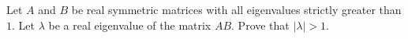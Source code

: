 Let \(A\) and \(B\) be real symmetric matrices with all eigenvalues strictly greater than \(1\). Let \(\lambda\) be a real eigenvalue of the matrix \(AB\). Prove that \(|\lambda| > 1\).